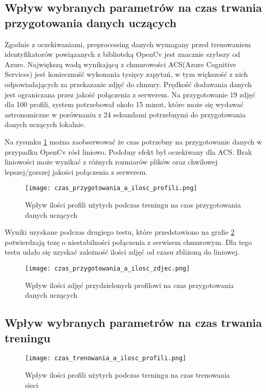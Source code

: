 \subsection{Wpływ wybranych parametrów na czas trwania przygotowania danych uczących}
Zgodnie z oczekiwaniami, preprocessing danych wymagany przed trenowaniem identyfikatorów powiązanych z biblioteką OpenCv jest znacznie szybszy od Azure. Największą wadą wynikającą z chmurowości  ACS(Azure Cognitive Services) jest konieczność wykonania tysięcy zapytań, w tym większość z nich odpowiadających za przekazanie zdjęć do chmury. Prędkość dodawania danych jest ograniczana przez jakość połączenia z serwerem. Na przygotowanie 19 zdjęć dla 100 profili, system potrzebował około 15 minut, które może się wydawać astronomiczne w porównaniu z 24 sekundami potrzebnymi do przygotowania danych uczących lokalnie.

Na rysunku \ref{fig:czas_p_profile} można zaobserwować że czas potrzebny na przygotowanie danych w przypadku OpenCv rósł liniowo. Podobny efekt był oczekiwany dla ACS. Brak liniowości może wynikać z różnych rozmiarów plików oraz chwilowej lepszej/gorszej jakości połączenia z serwerem.
\begin{figure}[H]
	\centering
	\texttt{[image: czas\_przygotowania\_a\_ilosc\_profili.png]}
	\caption{Wpływ ilości profili użytych podczas treningu na czas przygotowania danych uczących}
	\label{fig:czas_p_profile}
\end{figure}
Wyniki uzyskane podczas drugiego testu, które przedstawiono na grafie \ref{fig:czas_p_zdjecia} potwierdzają tezę o niestabilności połączenia z serwisem chmurowym. Dla tego testu udało się uzyskać zależność ilości zdjęć od czasu zbliżoną do liniowej.
\begin{figure}[H]
	\centering
	\texttt{[image: czas\_przygotowania\_a\_ilosc\_zdjec.png]}
	\caption{Wpływ ilości zdjęć przydzielonych profilowi na czas przygotowania danych uczących}
	\label{fig:czas_p_zdjecia}
\end{figure}

\subsection{Wpływ wybranych parametrów na czas trwania treningu}
\begin{figure}[H]
	\centering
	\texttt{[image: czas\_trenowania\_a\_ilosc\_profili.png]}
	\caption{Wpływ ilości profili użytych podczas treningu na czas trenowania sieci}
	\label{fig:czas_t_profile}
\end{figure}

